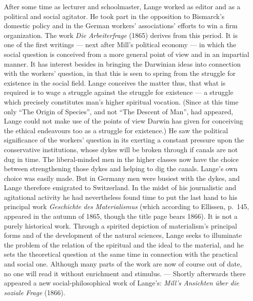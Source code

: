 \documentclass[12pt,a4paper]{book}
\newcommand{\opage}[1]{\marginnote{\footnotesize\textit{[#1]}}}
\begin{document}
After some time as lecturer and schoolmaster, Lange worked as editor and as a
political and social agitator. He took part in the opposition to Bismarck's
domestic policy and in the German workers' associations' efforts to win a firm
organization. The work \textit{Die Arbeiterfrage} (1865) derives from this
period. It is one of the first writings --- next after Mill's political economy
--- in which the social question is conceived from a more general point of view
and in an impartial manner. It has interest besides in bringing the Darwinian
ideas into connection with the workers' question, in that this is seen to spring
from the struggle for existence in the social field. Lange conceives the matter
thus, that what is required is to wage a struggle against the struggle for
existence --- a struggle which precisely constitutes man's higher spiritual
vocation. (Since at this time only ``The Origin of Species'', and not ``The
Descent of Man'', had appeared, Lange could not make use of the points of view
Darwin has given for conceiving the ethical endeavours too as a struggle for
existence.) He saw the political significance of the workers' question in its
exerting a constant pressure upon the conservative institutions, whose dykes will
be broken through if canals are not dug in time. The liberal-minded men in the
higher classes now have the choice between strengthening those dykes and helping
to dig the canals. Lange's own choice was easily made. But in Germany men were
busiest with the dykes, and Lange therefore emigrated to Switzerland. In the
midst of his journalistic and agitational activity he had nevertheless found time
to put the last hand to his principal work \textit{Geschichte des \opage{546}Materialismus}
(which according to Ellissen, p.~145, appeared in the autumn of 1865, though the
title page bears 1866). It is not a purely historical work. Through a spirited
depiction of materialism's principal forms and of the development of the natural
sciences, Lange seeks to illuminate the problem of the relation of the spiritual
and the ideal to the material, and he sets the theoretical question at the same
time in connection with the practical and social one. Although many parts of the
work are now of course out of date, no one will read it without enrichment and
stimulus. --- Shortly afterwards there appeared a new social-philosophical work
of Lange's: \textit{Mill's Ansichten über die soziale Frage} (1866).
\end{document}
